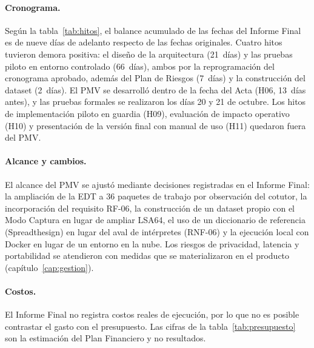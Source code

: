 \paragraph{Cronograma.} Según la tabla~\ref{tab:hitos}, el balance acumulado de las fechas del Informe Final es de nueve días de adelanto respecto de las fechas originales. Cuatro hitos tuvieron demora positiva: el diseño de la arquitectura (21~días) y las pruebas piloto en entorno controlado (66~días), ambos por la reprogramación del cronograma aprobado, además del Plan de Riesgos (7~días) y la construcción del dataset (2~días). El PMV se desarrolló dentro de la fecha del Acta (H06, 13~días antes), y las pruebas formales se realizaron los días 20 y 21 de octubre. Los hitos de implementación piloto en guardia (H09), evaluación de impacto operativo (H10) y presentación de la versión final con manual de uso (H11) quedaron fuera del PMV.

\paragraph{Alcance y cambios.} El alcance del PMV se ajustó mediante decisiones registradas en el Informe Final: la ampliación de la EDT a 36 paquetes de trabajo por observación del cotutor, la incorporación del requisito RF-06, la construcción de un dataset propio con el Modo Captura en lugar de ampliar LSA64, el uso de un diccionario de referencia (Spreadthesign) en lugar del aval de intérpretes (RNF-06) y la ejecución local con Docker en lugar de un entorno en la nube. Los riesgos de privacidad, latencia y portabilidad se atendieron con medidas que se materializaron en el producto (capítulo~\ref{cap:gestion}).

\paragraph{Costos.} El Informe Final no registra costos reales de ejecución, por lo que no es posible contrastar el gasto con el presupuesto. Las cifras de la tabla~\ref{tab:presupuesto} son la estimación del Plan Financiero y no resultados.
